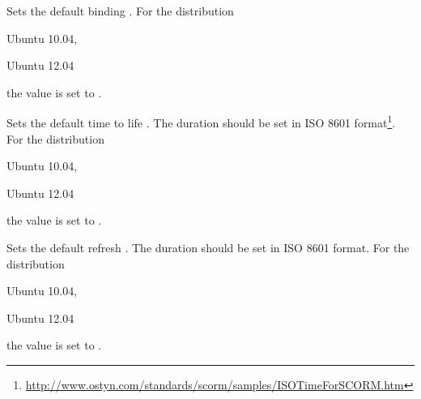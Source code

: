 
Sets the default binding . For the distribution
\begin{inparaitem}
\item[\TheDistribution{ubuntu}] Ubuntu 10.04,
\item[\TheDistribution{ubuntu}] Ubuntu 12.04
\end{inparaitem}
the value is set to .


Sets the default time to life . The duration should be set in 
ISO 8601 format\footnote{\url{http://www.ostyn.com/standards/scorm/samples/ISOTimeForSCORM.htm}}.
For the distribution
\begin{inparaitem}
\item[\TheDistribution{ubuntu}] Ubuntu 10.04,
\item[\TheDistribution{ubuntu}] Ubuntu 12.04
\end{inparaitem}
the value is set to .


Sets the default refresh . The duration should be set in 
ISO 8601 format.
For the distribution
\begin{inparaitem}
\item[\TheDistribution{ubuntu}] Ubuntu 10.04,
\item[\TheDistribution{ubuntu}] Ubuntu 12.04
\end{inparaitem}
the value is set to .


